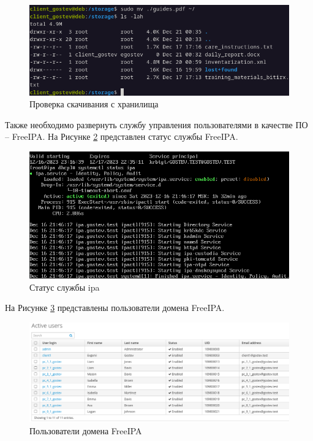 \documentclass[14pt, a4paper]{extarticle}
\numberwithin{equation}{section}
\begin{document}
\begin{figure}[H]
        \centering
        \includegraphics[scale=1]{services/iscsi/read.png}
        \caption{Проверка скачивания с хранилища}
        \label{fig:iscsi_read}
\end{figure}


Также необходимо развернуть службу управления пользователями в качестве ПО -- FreeIPA.
На Рисунке \ref{fig:ipa_status} представлен статус службы FreeIPA.
\begin{figure}[H]
        \centering
        \includegraphics[scale=1]{services/freeipa/ipa_status.png}
        \caption{Статус службы ipa}
        \label{fig:ipa_status}
\end{figure}

На Рисунке \ref{fig:ipa_users} представлены пользователи домена FreeIPA.
\begin{figure}[H]
        \centering
        \includegraphics[scale=0.65]{services/freeipa/users.png}
        \caption{Пользователи домена FreeIPA}
        \label{fig:ipa_users}
\end{figure}
\end{document}
